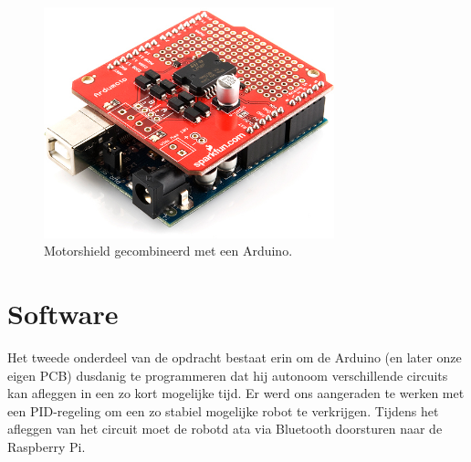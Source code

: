 \begin{figure}[H]
\centering
\includegraphics[width=0.75\textwidth]{ArduMoto.png}
\caption{Motorshield gecombineerd met een Arduino. \label{fig:ArduMoto}}
\end{figure}

\section{Software}
Het tweede onderdeel van de opdracht bestaat erin om de Arduino (en later onze eigen PCB) dusdanig te programmeren dat hij autonoom verschillende circuits kan afleggen in een zo kort mogelijke tijd. Er werd ons aangeraden te werken met een PID-regeling om een zo stabiel mogelijke robot te verkrijgen. Tijdens het afleggen van het circuit moet de robotd ata via Bluetooth doorsturen naar de Raspberry Pi.


 



